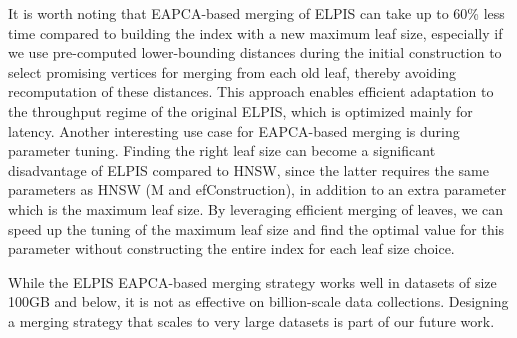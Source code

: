  
It is worth noting that EAPCA-based merging of ELPIS can take up to 60\% less time compared to building the index with a new maximum leaf size, especially if we use pre-computed lower-bounding distances during the initial construction to select promising vertices for merging from each old leaf, thereby avoiding recomputation of these distances. This approach enables efficient adaptation to the throughput regime of the original ELPIS, which is optimized mainly for latency. Another interesting use case for EAPCA-based merging is during parameter tuning. Finding the right leaf size can become a significant disadvantage of ELPIS compared to HNSW, since the latter requires the same parameters as HNSW (M and efConstruction), in addition to an extra parameter which is the maximum leaf size. By leveraging efficient merging of leaves, we can speed up the tuning of the maximum leaf size and find the optimal value for this parameter without constructing the entire index for each leaf size choice.

While the ELPIS EAPCA-based merging strategy works well in datasets of size 100GB and below,  it is not as effective on billion-scale data collections. Designing a merging strategy that scales to very large datasets is part of our future work.

